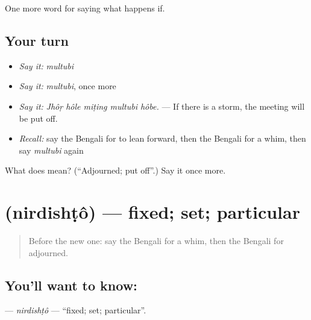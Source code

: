 \begin{grammarlens}[title={What you've built}]
One more word for saying what happens if.
\end{grammarlens}

\subsection*{Your turn}
\begin{itemize}
\raggedright
  \item \emph{Say it:} \emph{multubi}
  \item \emph{Say it:} \emph{multubi}, once more
  \item \emph{Say it:} \emph{Jhôṛ hôle miṭing multubi hôbe.} — If there is a storm, the meeting will be put off.
  \item \emph{Recall:} say the Bengali for to lean forward, then the Bengali for a whim, then say \emph{multubi} again
\end{itemize}

\begin{tcolorbox}[breakable,colback=teal!4,colframe=teal!35!black,title={Before you move on}]
What does  mean? (\textquotedblleft{}Adjourned; put off\textquotedblright{}.) Say it once more.
\end{tcolorbox}
\section[\texorpdfstring{\bn{নির্দিষ্ট} (nirdishṭô)}{নির্দিষ্ট (nirdishṭô)}]{ (nirdishṭô) — fixed; set; particular}

\label{lesson:BN-C530-nirdishto}



\begin{quote}
Before the new one: say the Bengali for a whim, then the Bengali for adjourned.
\end{quote}

\subsection*{You'll want to know: }
\textbf{} — \emph{nirdishṭô} — \textquotedblleft{}fixed; set; particular\textquotedblright{}.

\begin{quote}
       
\end{quote}

